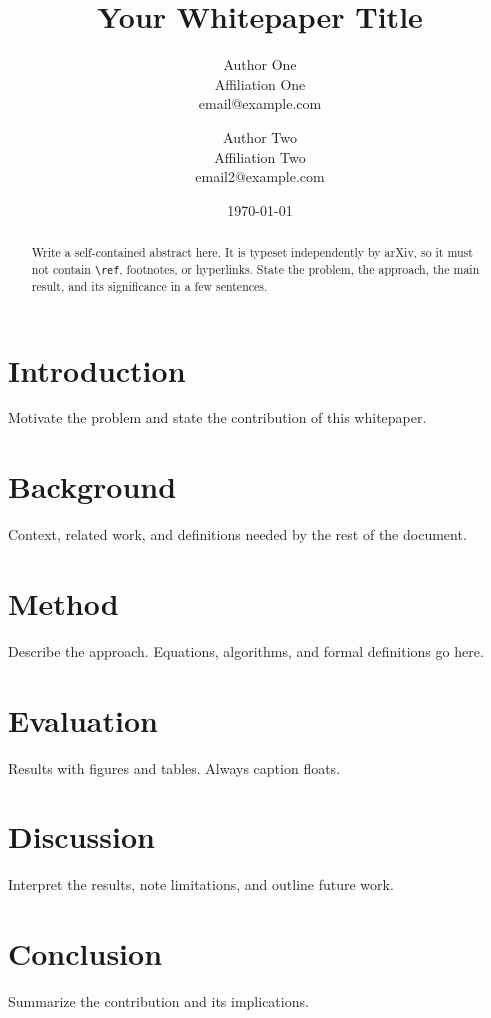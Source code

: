 \documentclass[11pt]{article}
\title{Your Whitepaper Title}
\author{
  Author One \\ \small Affiliation One \\ \small email@example.com
  \and
  Author Two \\ \small Affiliation Two \\ \small email2@example.com
}
\date{\today}
\begin{document}
\maketitle

\begin{abstract}
Write a self-contained abstract here. It is typeset independently by arXiv,
so it must not contain \verb|\ref|, footnotes, or hyperlinks. State the problem,
the approach, the main result, and its significance in a few sentences.
\end{abstract}

\section{Introduction}
Motivate the problem and state the contribution of this whitepaper.

\section{Background}
Context, related work, and definitions needed by the rest of the document.

\section{Method}
Describe the approach. Equations, algorithms, and formal definitions go here.

\section{Evaluation}
Results with figures and tables. Always caption floats.

\section{Discussion}
Interpret the results, note limitations, and outline future work.

\section{Conclusion}
Summarize the contribution and its implications.

% 
\end{document}
